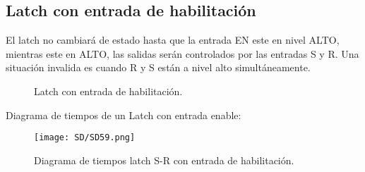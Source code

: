 \documentclass[
	11pt, %
	fleqn, %
	a4paper, %
]{LegrandOrangeBook}
\begin{document}
\subsection{Latch con entrada de habilitación}
El latch no cambiará de estado hasta que la entrada EN este en nivel ALTO, mientras este en ALTO, las salidas serán controlados por las entradas S y R. Una situación invalida es cuando R y S están a nivel alto simultáneamente.
\begin{figure}[h]
    \centering
    \qquad
    \caption{Latch con entrada de habilitación.}
\end{figure}
Diagrama de tiempos de un Latch con entrada enable:
\begin{figure}[H]
\centering
\texttt{[image: SD/SD59.png]}
\caption{Diagrama de tiempos latch S-R con entrada de habilitación.}
\end{figure}
\end{document}
